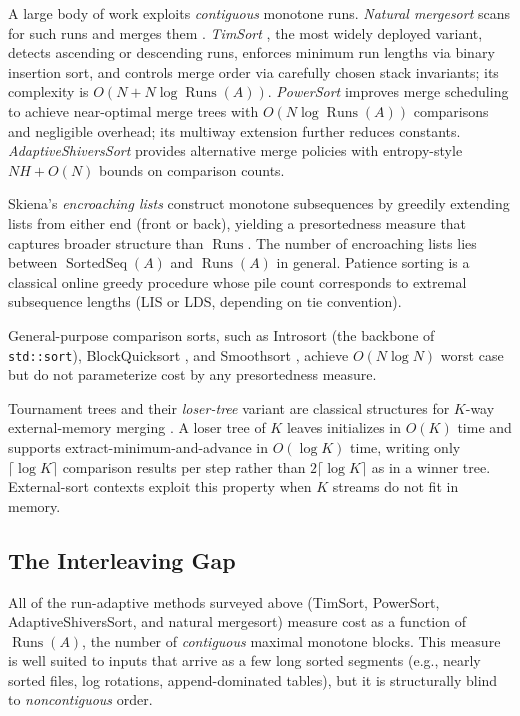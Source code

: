 \documentclass[12pt,a4paper]{article}
\theoremstyle{plain}
\theoremstyle{definition}
\DeclareMathOperator{\Runs}{Runs}
\DeclareMathOperator{\SortedSeq}{SortedSeq}
\begin{document}
A large body of work exploits \emph{contiguous} monotone runs.
\emph{Natural mergesort} scans for such runs and merges them
\cite{Knuth1998}.  \emph{TimSort} \cite{Auger2018}, the most widely
deployed variant, detects ascending or descending runs, enforces minimum
run lengths via binary insertion sort, and controls merge order via
carefully chosen stack invariants; its complexity is $O(N + N\log\Runs(A))$.
\emph{PowerSort} \cite{MunroWild2018} improves merge scheduling to achieve
near-optimal merge trees with $O(N\log\Runs(A))$ comparisons and negligible
overhead; its multiway extension \cite{GellingNebel2023} further reduces
constants.  \emph{AdaptiveShiversSort} \cite{Juge2020} provides alternative
merge policies with entropy-style $NH + O(N)$ bounds on comparison counts.

Skiena's \emph{encroaching lists} \cite{Skiena1988} construct monotone
subsequences by greedily extending lists from either end (front or back),
yielding a presortedness measure that captures broader structure than
$\Runs$.  The number of encroaching lists lies between $\SortedSeq(A)$ and
$\Runs(A)$ in general.  Patience sorting \cite{AldousDiaconis1999} is a
classical online greedy procedure whose pile count corresponds to extremal
subsequence lengths (LIS or LDS, depending on tie convention).

General-purpose comparison sorts, such as Introsort \cite{BentleyMcIlroy1993,CLRS2022}
(the backbone of \texttt{std::sort}), BlockQuicksort \cite{Edelkamp2016},
and Smoothsort \cite{Dijkstra1981}, achieve $O(N\log N)$ worst case but
do not parameterize cost by any presortedness measure.

Tournament trees and their \emph{loser-tree} variant are classical
structures for $K$-way external-memory merging \cite{Knuth1998}.  A loser
tree of $K$ leaves initializes in $O(K)$ time and supports
extract-minimum-and-advance in $O(\log K)$ time, writing only
$\lceil \log K \rceil$ comparison results per step rather than
$2\lceil\log K\rceil$ as in a winner tree.  External-sort
contexts \cite{Aggarwal1988,Polyntsov2022} exploit this property when $K$
streams do not fit in memory.

\subsection{The Interleaving Gap}
\label{sec:interleaving_gap}

All of the run-adaptive methods surveyed above (TimSort, PowerSort,
AdaptiveShiversSort, and natural mergesort) measure cost as a function of
$\Runs(A)$, the number of \emph{contiguous} maximal monotone blocks.  This
measure is well suited to inputs that arrive as a few long sorted segments
(e.g., nearly sorted files, log rotations, append-dominated tables), but it
is structurally blind to \emph{noncontiguous} order.
\end{document}
